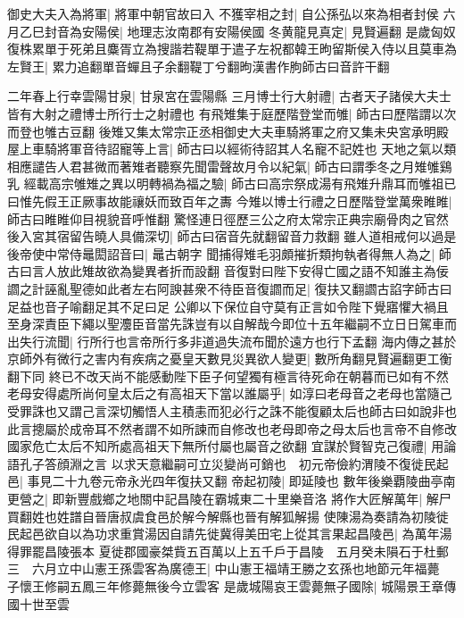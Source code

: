 御史大夫入為將軍|{
	將軍中朝官故曰入}
不獲宰相之封|{
	自公孫弘以來為相者封侯}
六月乙巳封音為安陽侯|{
	地理志汝南郡有安陽侯國}
冬黄龍見真定|{
	見賢遍翻}
是歲匈奴復株累單于死弟且麋胥立為搜諧若鞮單于遣子左祝都韓王昫留斯侯入侍以且莫車為左賢王|{
	累力追翻單音蟬且子余翻鞮丁兮翻昫漢書作胊師古曰音許干翻}


二年春上行幸雲陽甘泉|{
	甘泉宮在雲陽縣}
三月博士行大射禮|{
	古者天子諸侯大夫士皆有大射之禮博士所行士之射禮也}
有飛雉集于庭歷階登堂而雊|{
	師古曰歷階謂以次而登也雊古豆翻}
後雉又集太常宗正丞相御史大夫車騎將軍之府又集未央宮承明殿屋上車騎將軍音待詔寵等上言|{
	師古曰以經術待詔其人名寵不記姓也}
天地之氣以類相應譴告人君甚微而著雉者聽察先聞雷聲故月令以紀氣|{
	師古曰謂季冬之月雉雊鷄乳}
經載高宗雊雉之異以明轉禍為福之驗|{
	師古曰高宗祭成湯有飛雉升鼎耳而雊祖已曰惟先假王正厥事故能禳妖而致百年之夀}
今雉以博士行禮之日歷階登堂萬衆睢睢|{
	師古曰睢睢仰目視貌音呼惟翻}
驚怪連日徑歷三公之府太常宗正典宗廟骨肉之官然後入宮其宿留告曉人具備深切|{
	師古曰宿音先就翻留音力救翻}
雖人道相戒何以過是後帝使中常侍鼂閎詔音曰|{
	鼂古朝字}
聞捕得雉毛羽頗摧折類拘執者得無人為之|{
	師古曰言人放此雉故欲為變異者折而設翻}
音復對曰陛下安得亡國之語不知誰主為佞讇之計誣亂聖德如此者左右阿諛甚衆不待臣音復讇而足|{
	復扶又翻讇古諂字師古曰足益也音子喻翻足其不足曰足}
公卿以下保位自守莫有正言如令陛下覺寤懼大禍且至身深責臣下繩以聖灋臣音當先誅豈有以自解哉今即位十五年繼嗣不立日日駕車而出失行流聞|{
	行所行也言帝所行多非道過失流布聞於遠方也行下孟翻}
海内傳之甚於京師外有微行之害内有疾病之憂皇天數見災異欲人變更|{
	數所角翻見賢遍翻更工衡翻下同}
終已不改天尚不能感動陛下臣子何望獨有極言待死命在朝暮而已如有不然老母安得處所尚何皇太后之有高祖天下當以誰屬乎|{
	如淳曰老母音之老母也當隨己受罪誅也又謂己言深切觸悟人主積恚而犯必行之誅不能復顧太后也師古曰如說非也此言摠屬於成帝耳不然者謂不如所諫而自修改也老母即帝之母太后也言帝不自修改國家危亡太后不知所處高祖天下無所付屬也屬音之欲翻}
宜謀於賢智克己復禮|{
	用論語孔子答顔淵之言}
以求天意繼嗣可立災變尚可銷也　初元帝儉約渭陵不復徙民起邑|{
	事見二十九卷元帝永光四年復扶又翻}
帝起初陵|{
	即延陵也}
數年後樂覇陵曲亭南更營之|{
	即新豐戲鄉之地關中記昌陵在霸城東二十里樂音洛}
將作大匠解萬年|{
	解尸買翻姓也姓譜自晉唐叔虞食邑於解今解縣也晉有解狐解揚}
使陳湯為奏請為初陵徙民起邑欲自以為功求重賞湯因自請先徙冀得美田宅上從其言果起昌陵邑|{
	為萬年湯得罪罷昌陵張本}
夏徙郡國豪桀貲五百萬以上五千戶于昌陵　五月癸未隕石于杜郵三　六月立中山憲王孫雲客為廣德王|{
	中山憲王福靖王勝之玄孫也地節元年福薨　子懷王修嗣五鳳三年修薨無後今立雲客}
是歲城陽哀王雲薨無子國除|{
	城陽景王章傳國十世至雲}



